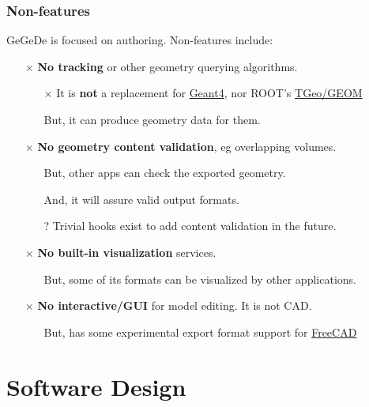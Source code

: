 \documentclass[10pt,xcolor=dvipsnames]{beamer}
\begin{document}
\begin{frame}
  \frametitle{Non-features}
  GeGeDe is focused on authoring.  Non-features include:
  \vspace{5mm}
  \begin{itemize}
  \item[$\times$] \textbf{No tracking} or other geometry querying algorithms.  
    \begin{itemize}\footnotesize
    \item[$\times$] It is \textbf{not} a replacement for
      \href{https://geant4.web.cern.ch/}{Geant4}, nor ROOT's
      \href{https://root.cern.ch/root/html/GEOM_GEOM_Index.html}{TGeo/GEOM}
    \item[\checkmark] But, it can produce geometry data for them.
    \end{itemize}
  \item[$\times$] \textbf{No geometry content validation}, eg overlapping volumes.
    \begin{itemize}\footnotesize
    \item[\checkmark] But, other apps can check the exported geometry.
    \item[\checkmark] And, it will assure valid output formats.
    \item[?] Trivial hooks exist to add content validation in the future.
    \end{itemize}
  \item[$\times$] \textbf{No built-in visualization} services.
    \begin{itemize}\footnotesize
    \item[\checkmark] But, some of its formats can be visualized by other applications.
    \end{itemize}
  \item[$\times$] \textbf{No interactive/GUI} for model editing. It is not CAD.
    \begin{itemize}\footnotesize
    \item[\checkmark] But, has some experimental export format support for \href{https://www.freecadweb.org/}{FreeCAD}
    \end{itemize}
  \end{itemize}
\end{frame}

\section{Software Design}
\begin{frame}
\end{frame}
\end{document}
